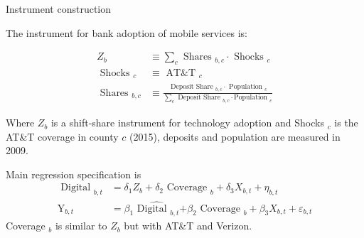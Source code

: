 \documentclass[notes,10pt, aspectratio=169]{beamer}
\newenvironment{wideitemize}{\itemize\addtolength{\itemsep}{10pt}}{\enditemize}
\begin{document}
\begin{frame}{Instrument construction}


    \begin{wideitemize}
    \item The instrument for bank adoption of mobile services is: 

    $$
    \begin{aligned}
 Z_b & \equiv \sum_c \text { Shares }_{b, c} \cdot \text { Shocks }_c \\
        \text { Shocks }_c & \equiv \text { AT\&T }_c \\
        \text { Shares }_{b, c} & \equiv \frac{\text { Deposit Share }_{b, c} \cdot \text { Population }_c}{\sum_c \text { Deposit Share }_{b, c} \cdot \text {Population }_c}
        \end{aligned}
    $$

 Where $Z_b$ is a shift-share instrument for technology adoption and Shocks $_c$ is the AT\&T coverage in county $c$ (2015), deposits and population are measured in 2009.

    \pause
    \item Main regression specification is
    $$
    \begin{aligned}
        \text { Digital }_{b, t} & =\delta_1 Z_b+\delta_2 \text { Coverage }_b+\delta_3 X_{b, t}+\eta_{b, t} \\
        \mathrm{Y}_{b, t} & =\beta_1{\widehat{\text { Digital }_{b, t}}}{+\beta_2 \text { Coverage }_b+\beta_3 X_{b, t}+\varepsilon_{b, t}}
        \end{aligned}
    $$
 Coverage $_b$ is similar to $Z_b$ but with AT\&T and Verizon.

    \end{wideitemize}

\end{frame}
\end{document}
